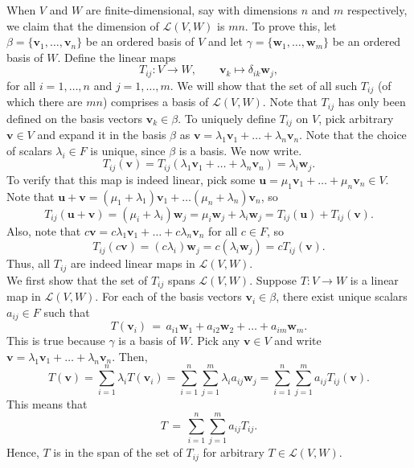 \documentclass[10pt]{article}
\def\u{\bm{u}}
\def\v{\bm{v}}
\def\w{\bm{w}}
\def\L{\mathcal{L}}
\begin{document}
        When $V$ and $W$ are finite-dimensional, say with dimensions $n$ and $m$ respectively, we claim that the dimension of $\L(V, W)$ is
        $mn$.
        To prove this, let $\beta = \{\v_1, \dots, \v_n\}$ be an ordered basis of $V$ and let $\gamma = \{\w_1, \dots, \w_m\}$ be an ordered basis of $W$.
        Define the linear maps
        \[
                T_{ij}\colon V \to W, \qquad \v_k \mapsto \delta_{ik}\w_j,
        \]
        for all $i = 1, \dots, n$ and $j = 1, \dots, m$. We will show that the set of all such $T_{ij}$ (of which there are $mn$) comprises a
        basis of $\L(V, W)$.
        Note that $T_{ij}$ has only been defined on the basis vectors $\v_k \in \beta$. To uniquely define $T_{ij}$ on $V$, pick arbitrary
        $\v \in V$ and expand it in the basis $\beta$ as $\v = \lambda_1\v_1 + \dots + \lambda_n\v_n$. Note that the choice of scalars $\lambda_i \in F$
        is unique, since $\beta$ is a basis. We now write.
        \[
                T_{ij}(\v) = T_{ij}(\lambda_1\v_1 + \dots + \lambda_n\v_n) = \lambda_i\w_j.
        \]
        To verify that this map is indeed linear, pick some $\u = \mu_1\v_1 + \dots + \mu_n \v_n \in V$.
        Note that $\u + \v = (\mu_1 + \lambda_1)\v_1 + \dots (\mu_n + \lambda_n)\v_n$, so 
        \[
                T_{ij}(\u + \v) = (\mu_i + \lambda_i)\w_j = \mu_i\w_j + \lambda_i\w_j = T_{ij}(\u) + T_{ij}(\v).
        \]
        Also, note that $c\v = c\lambda_1\v_1 + \dots + c\lambda_n\v_n$ for all $c\in F$, so
        \[
                T_{ij}(c\v) = (c\lambda_i)\w_j = c(\lambda_i\w_j) = cT_{ij}(\v).
        \]
        Thus, all $T_{ij}$ are indeed linear maps in $\L(V, W)$. \\

        We first show that the set of $T_{ij}$ spans $\L(V, W)$.
        Suppose $T\colon V \to W$ is a linear map in $\L(V, W)$. For each of the basis vectors $\v_i \in \beta$, there exist unique
        scalars $a_{ij} \in F$ such that
        \[
                T(\v_i) \,=\, a_{i1}\w_1 + a_{i2}\w_2 + \dots + a_{im}\w_m.
        \]
        This is true because $\gamma$ is a basis of $W$.
        Pick any $\v \in V$ and write $\v = \lambda_1\v_1 + \dots + \lambda_n\v_n$. Then,
        \[
                T(\v) = \sum_{i = 1}^n \lambda_i T(\v_i) = \sum_{i = 1}^n \sum_{j = 1}^m \lambda_i a_{ij}\w_j
                        = \sum_{i = 1}^n \sum_{j = 1}^m a_{ij} T_{ij}(\v).
        \]
        This means that
        \[
                T \,=\, \sum_{i = 1}^n \sum_{j = 1}^m a_{ij} T_{ij}.
        \]
        Hence, $T$ is in the span of the set of $T_{ij}$ for arbitrary $T \in \L(V, W)$. \\
\end{document}
